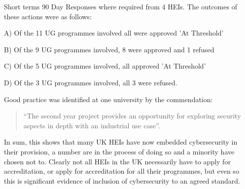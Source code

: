 \documentclass[conference]{IEEEtran}
\begin{document}
Short terms 90 Day Responses where required from 4 HEIs. The outcomes of these actions were as follows:
                                                                        
A)	Of the 11 UG programmes involved all were approved 'At Threshold'

B)	Of the 9 UG programmes involved, 8 were approved and 1 refused

C)	Of the 5 UG programmes involved, all approved 'At Threshold'

D)	Of the 3 UG programmes involved, all 3 were refused.
 
Good practice was identified at one university by the commendation:
 \begin{quote}
``The second year project provides an opportunity for exploring security aspects in depth with an industrial use case''.
\end{quote}
In sum, this shows that many UK HEIs have now embedded cybersecurity in their provision, a number are in the process of doing so and a minority have chosen not to. Clearly not all HEIs in the UK necessarily have to apply for accreditation, or apply for accreditation for all their programmes, but even so this is significant evidence of inclusion of cybersecurity to an agreed standard.
\end{document}
